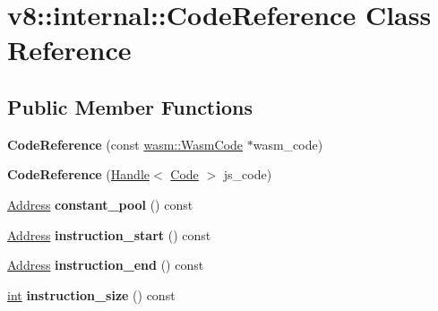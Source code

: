 \hypertarget{classv8_1_1internal_1_1CodeReference}{}\section{v8\+:\+:internal\+:\+:Code\+Reference Class Reference}
\label{classv8_1_1internal_1_1CodeReference}
\subsection*{Public Member Functions}
\begin{DoxyCompactItemize}
\item 
\mbox{\label{classv8_1_1internal_1_1CodeReference_a56641682eab8047655054c844d130cf5}} 
{\bfseries Code\+Reference} (const \mbox{\hyperlink{classv8_1_1internal_1_1wasm_1_1WasmCode}{wasm\+::\+Wasm\+Code}} $\ast$wasm\+\_\+code)
\item 
\mbox{\label{classv8_1_1internal_1_1CodeReference_a26e85224180ab2626118524d74eab0aa}} 
{\bfseries Code\+Reference} (\mbox{\hyperlink{classv8_1_1internal_1_1Handle}{Handle}}$<$ \mbox{\hyperlink{classv8_1_1internal_1_1Code}{Code}} $>$ js\+\_\+code)
\item 
\mbox{\label{classv8_1_1internal_1_1CodeReference_a2c32278fc2e256b107ec90f26b41eac2}} 
\mbox{\hyperlink{classuintptr__t}{Address}} {\bfseries constant\+\_\+pool} () const
\item 
\mbox{\label{classv8_1_1internal_1_1CodeReference_afbf26f99d73d0d3c4feb59fa5052d05e}} 
\mbox{\hyperlink{classuintptr__t}{Address}} {\bfseries instruction\+\_\+start} () const
\item 
\mbox{\label{classv8_1_1internal_1_1CodeReference_a05cd1882262b40f7a12efbd0aad89a1e}} 
\mbox{\hyperlink{classuintptr__t}{Address}} {\bfseries instruction\+\_\+end} () const
\item 
\mbox{\label{classv8_1_1internal_1_1CodeReference_a2a1f3d772017036c734c0d74657b3765}} 
\mbox{\hyperlink{classint}{int}} {\bfseries instruction\+\_\+size} () const

\end{DoxyCompactItemize}
